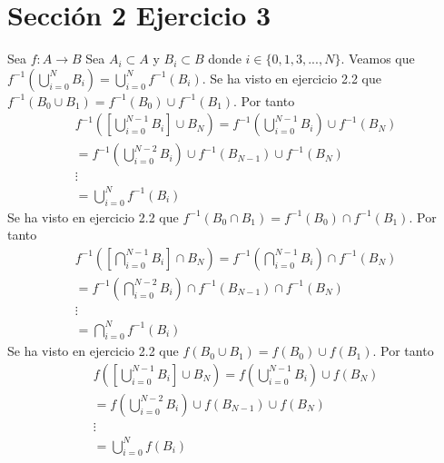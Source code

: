 \documentclass{article}
\begin{document}

\section{Sección 2 Ejercicio 3}

Sea \(f: A \longrightarrow B\) Sea \(A_i \subset A\) y \(B_i \subset B\) donde \(i\in\{0,1,3,...,N\}\). \newline
Veamos que \(f^{-1}(\bigcup\limits_{i=0}^{N} B_i)=\bigcup\limits_{i=0}^{N} f^{-1}(B_i)\).
\newline
Se ha visto en ejercicio 2.2 que \(f^{-1}(B_0\cup B_1)=f^{-1}(B_0)\cup f^{-1}(B_1)\). Por tanto \newline
\begin{equation}
\begin{aligned}
f^{-1}\left( \left[\bigcup\limits_{i=0}^{N-1}B_i\right] \cup B_N \right)=f^{-1}\left(\bigcup\limits_{i=0}^{N-1} B_i\right)\cup f^{-1}( B_N ) \\ 
=f^{-1}\left(\bigcup\limits_{i=0}^{N-2} B_i\right)\cup f^{-1}( B_{N-1})\cup f^{-1}( B_N )
\\ \vdots \\
=\bigcup \limits_{i=0}^{N}f^{-1}\left( B_i \right)
\end{aligned}
\end{equation}
\newline
Se ha visto en ejercicio 2.2 que \(f^{-1}(B_0\cap B_1)=f^{-1}(B_0)\cap f^{-1}(B_1)\). Por tanto \newline
\begin{equation}
\begin{aligned}
f^{-1}\left( \left[\bigcap\limits_{i=0}^{N-1}B_i\right] \cap B_N \right)=f^{-1}\left(\bigcap\limits_{i=0}^{N-1} B_i\right)\cap f^{-1}( B_N ) \\ 
=f^{-1}\left(\bigcap\limits_{i=0}^{N-2} B_i\right)\cap f^{-1}( B_{N-1})\cap f^{-1}( B_N )
\\ \vdots \\
=\bigcap \limits_{i=0}^{N}f^{-1}\left( B_i \right)
\end{aligned}
\end{equation}
\newline
Se ha visto en ejercicio 2.2 que \(f(B_0\cup B_1)=f(B_0)\cup f(B_1)\). Por tanto \newline
\begin{equation}
\begin{aligned}
f\left( \left[\bigcup\limits_{i=0}^{N-1}B_i\right] \cup B_N \right)=f\left(\bigcup\limits_{i=0}^{N-1} B_i\right)\cup f( B_N ) \\ 
=f\left(\bigcup\limits_{i=0}^{N-2} B_i\right)\cup f( B_{N-1})\cup f( B_N )
\\ \vdots \\
=\bigcup \limits_{i=0}^{N}f\left( B_i \right)
\end{aligned}
\end{equation}
\end{document}
